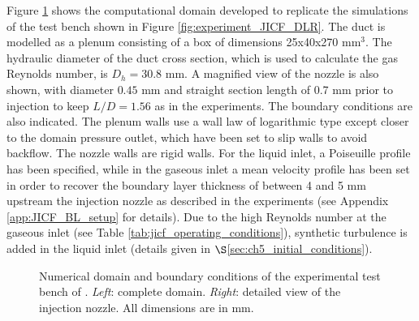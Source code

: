 Figure \ref{fig:numerical_setup_maquette_JICF_DLR} shows the computational domain developed to replicate the simulations of the test bench shown in Figure \ref{fig:experiment_JICF_DLR}. The duct is modelled as a plenum consisting of a box of dimensions 25x40x270 mm$^3$. The hydraulic diameter of the duct cross section, which is used to calculate the gas Reynolds number, is $D_h = 30.8$ mm. A magnified view of the nozzle is also shown, with diameter $0.45$ mm and straight section length of 0.7 mm prior to injection to keep $L/D = 1.56$ as in the experiments. The boundary conditions are also indicated. The plenum walls use a wall law of logarithmic type except closer to the domain pressure outlet, which have been set to slip walls to avoid backflow. The nozzle walls are rigid walls. For the liquid inlet, a Poiseuille profile has been specified, while in the gaseous inlet a mean velocity profile has been set in order to recover the boundary layer thickness of between 4 and 5 mm upstream the injection nozzle as described in the experiments (see Appendix \ref{app:JICF_BL_setup} for details). Due to the high Reynolds number at the gaseous inlet (see Table \ref{tab:jicf_operating_conditions}), synthetic turbulence is added in the liquid inlet (details given in $\S$\ref{sec:ch5_initial_conditions}).

\begin{figure}[ht]
     \centering
      \caption{Numerical domain and boundary conditions of the experimental test bench of . \textsl{Left}: complete domain. \textsl{Right}: detailed view of the injection nozzle. All dimensions are in mm.}
      \label{fig:numerical_setup_maquette_JICF_DLR}
\end{figure}


